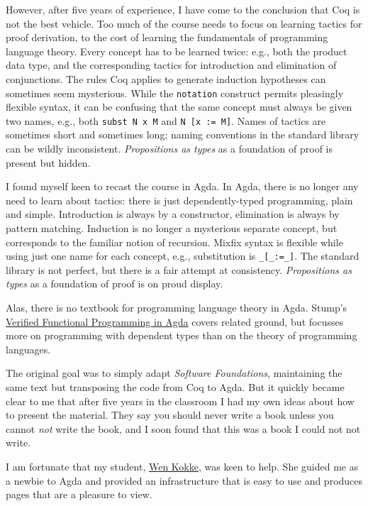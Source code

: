 However, after five years of experience, I have come to the conclusion
that Coq is not the best vehicle. Too much of the course needs to focus
on learning tactics for proof derivation, to the cost of learning the
fundamentals of programming language theory. Every concept has to be
learned twice: e.g., both the product data type, and the corresponding
tactics for introduction and elimination of conjunctions. The rules Coq
applies to generate induction hypotheses can sometimes seem mysterious.
While the \texttt{notation} construct permits pleasingly flexible
syntax, it can be confusing that the same concept must always be given
two names, e.g., both \texttt{subst\ N\ x\ M} and
\texttt{N\ {[}x\ :=\ M{]}}. Names of tactics are sometimes short and
sometimes long; naming conventions in the standard library can be wildly
inconsistent. \emph{Propositions as types} as a foundation of proof is
present but hidden.

I found myself keen to recast the course in Agda. In Agda, there is no
longer any need to learn about tactics: there is just dependently-typed
programming, plain and simple. Introduction is always by a constructor,
elimination is always by pattern matching. Induction is no longer a
mysterious separate concept, but corresponds to the familiar notion of
recursion. Mixfix syntax is flexible while using just one name for each
concept, e.g., substitution is \texttt{\_{[}\_:=\_{]}}. The standard
library is not perfect, but there is a fair attempt at consistency.
\emph{Propositions as types} as a foundation of proof is on proud
display.

Alas, there is no textbook for programming language theory in Agda.
Stump's
\href{https://www.morganclaypoolpublishers.com/catalog_Orig/product_info.php?cPath=24\&products_id=908}{Verified
Functional Programming in Agda} covers related ground, but focusses more
on programming with dependent types than on the theory of programming
languages.

The original goal was to simply adapt \emph{Software Foundations},
maintaining the same text but transposing the code from Coq to Agda. But
it quickly became clear to me that after five years in the classroom I
had my own ideas about how to present the material. They say you should
never write a book unless you cannot \emph{not} write the book, and I
soon found that this was a book I could not not write.

I am fortunate that my student, \href{https://github.com/wenkokke}{Wen
Kokke}, was keen to help. She guided me as a newbie to Agda and provided
an infrastructure that is easy to use and produces pages that are a
pleasure to view.

